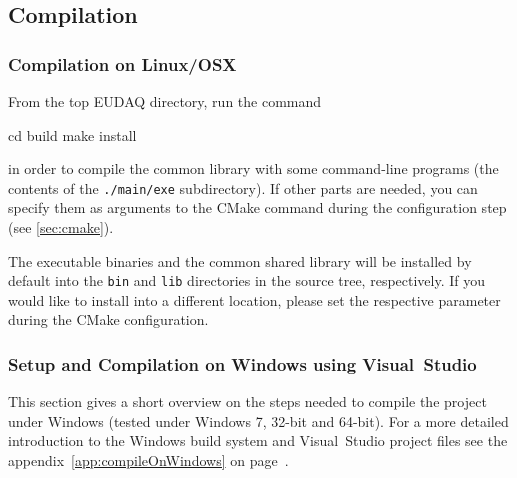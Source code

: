 \subsection{Compilation}

\subsubsection{Compilation on Linux/OSX}
From the top EUDAQ directory, run the command
\begin{listing}[mybash]
cd build
make install
\end{listing}
in order to compile the common library with some command-line programs (the contents of the \texttt{./main/exe} subdirectory).
If other parts are needed, you can specify them as arguments to the
CMake command during the configuration step (see \ref{sec:cmake}).

The executable binaries and the common shared library will be installed by default into the
\texttt{bin} and \texttt{lib} directories in the source tree,
respectively. If you would like to install into a different location,
please set the respective parameter during the CMake configuration.

\subsubsection{Setup and Compilation on Windows using Visual~Studio}

This section gives a short overview on the steps needed to compile the
project under Windows (tested under Windows 7, 32-bit and 64-bit). For a more
detailed introduction to the Windows build system and Visual~Studio
project files see the appendix~\ref{app:compileOnWindows} on
page~\pageref{app:compileOnWindows}.

